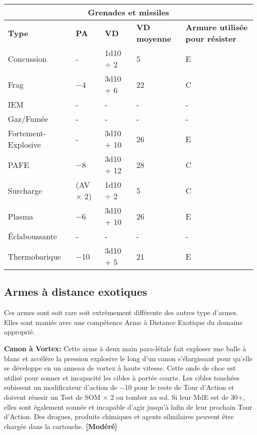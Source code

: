 \begin{table} \begin{tabular}{|l|l|l|l|l|} \hline

\multicolumn{5}{|c|}{\textbf{Grenades et missiles}} \\ \hline

\textbf{Type}	&\textbf{PA}	&\textbf{VD}	&\textbf{VD moyenne}	&\textbf{Armure utilisée pour résister} \\ \hline

Concussion	&- &1d10 $\div$ 2	&5	&E \\ \hline

Frag	&$-$4	&3d10 + 6	&22	&C \\ \hline

IEM	&- &- &- &- \\ \hline

Gaz/Fumée	&- &- &- &- \\ \hline

Fortement-Explosive	&- &3d10 + 10	&26	&E \\ \hline

PAFE	&$-$8	&3d10 + 12	&28	&C \\ \hline

Surcharge	&(AV $\times$ 2)	&1d10 $\div$ 2	&5	&C \\ \hline

Plasma	&$-$6	&3d10 + 10	&26	&E \\ \hline

Éclaboussante	&- &- &- &- \\ \hline

Thermobarique	&$-$10	&3d10 + 5	&21	&E \\ \hline

\end{tabular} \label{tab:grenades-seekers} \end{table} 

\subsection{Armes à distance exotiques} \label{sec:exotic-ranged-weapons} 

Ces armes sont soit rare soit extrêmement différente des autres type d'armes. Elles sont maniée avec une compétence Arme à Distance Exotique du domaine approprié. 

\textbf{Canon à Vortex:} Cette arme à deux main para-létale fait exploser une balle à blanc et accélère la pression explosive le long d'un canon s'élargissant pour qu'elle se développe en un anneau de vortex à haute vitesse. Cette onde de choc est utilisé pour sonner et incapacité les cibles à portée courte. Les cibles touchées subissent un modificateur d'action de $-$10 pour le reste de Tour d'Action et doivent réussir un Test de SOM $\times$ 2 ou tomber au sol. Si leur MdE est de 30+, elles sont également sonnée et incapable d'agir jusqu'à lafin de leur prochain Tour d'Action. Des drogues, produits chimiques et agents silmilaires peuvent être chargée dans la cartouche. \textbf{[Modéré]} 

